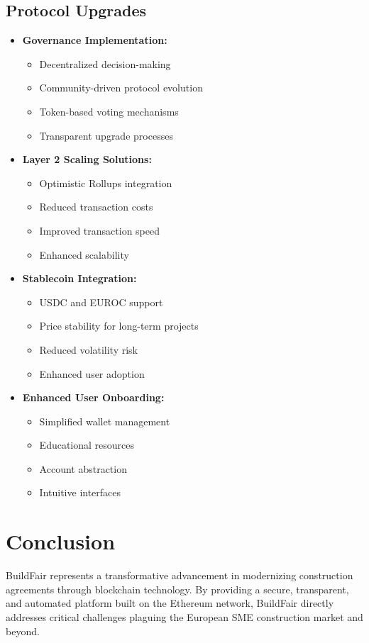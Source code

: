 \documentclass[12pt]{article}
\begin{document}
\subsection{Protocol Upgrades}
\begin{itemize}
    \item \textbf{Governance Implementation:}
    \begin{itemize}
        \item Decentralized decision-making
        \item Community-driven protocol evolution
        \item Token-based voting mechanisms
        \item Transparent upgrade processes
    \end{itemize}
    
    \item \textbf{Layer 2 Scaling Solutions:}
    \begin{itemize}
        \item Optimistic Rollups integration
        \item Reduced transaction costs
        \item Improved transaction speed
        \item Enhanced scalability
    \end{itemize}
    
    \item \textbf{Stablecoin Integration:}
    \begin{itemize}
        \item USDC and EUROC support
        \item Price stability for long-term projects
        \item Reduced volatility risk
        \item Enhanced user adoption
    \end{itemize}
    
    \item \textbf{Enhanced User Onboarding:}
    \begin{itemize}
        \item Simplified wallet management
        \item Educational resources
        \item Account abstraction
        \item Intuitive interfaces
    \end{itemize}
\end{itemize}

\section{Conclusion}
BuildFair represents a transformative advancement in modernizing construction agreements through blockchain technology. By providing a secure, transparent, and automated platform built on the Ethereum network, BuildFair directly addresses critical challenges plaguing the European SME construction market and beyond.
\end{document}
